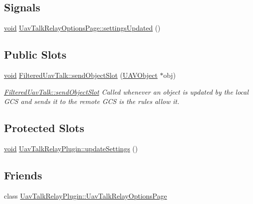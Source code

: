 \subsection*{\-Signals}
\begin{DoxyCompactItemize}
\item 
\hyperlink{group___u_a_v_objects_plugin_ga444cf2ff3f0ecbe028adce838d373f5c}{void} \hyperlink{group___u_a_v_talk_gace88a60fb10cfb6c3994f0a3a8883aa3}{\-Uav\-Talk\-Relay\-Options\-Page\-::settings\-Updated} ()
\end{DoxyCompactItemize}
\subsection*{\-Public \-Slots}
\begin{DoxyCompactItemize}
\item 
\hyperlink{group___u_a_v_objects_plugin_ga444cf2ff3f0ecbe028adce838d373f5c}{void} \hyperlink{group___u_a_v_talk_ga41ca9188bbbc0be7e458f94ef49117df}{\-Filtered\-Uav\-Talk\-::send\-Object\-Slot} (\hyperlink{class_u_a_v_object}{\-U\-A\-V\-Object} $\ast$obj)
\begin{DoxyCompactList}\small\item\em \hyperlink{group___u_a_v_talk_ga41ca9188bbbc0be7e458f94ef49117df}{\-Filtered\-Uav\-Talk\-::send\-Object\-Slot} \-Called whenever an object is updated by the local \-G\-C\-S and sends it to the remote \-G\-C\-S is the rules allow it. \end{DoxyCompactList}\end{DoxyCompactItemize}
\subsection*{\-Protected \-Slots}
\begin{DoxyCompactItemize}
\item 
\hyperlink{group___u_a_v_objects_plugin_ga444cf2ff3f0ecbe028adce838d373f5c}{void} \hyperlink{group___u_a_v_talk_gac6522ac462e3ef789bccecdf33e38779}{\-Uav\-Talk\-Relay\-Plugin\-::update\-Settings} ()
\end{DoxyCompactItemize}
\subsection*{\-Friends}
\begin{DoxyCompactItemize}
\item 
class \hyperlink{group___u_a_v_talk_gaf20a0868107dbd85408f5bcba4e98063}{\-Uav\-Talk\-Relay\-Plugin\-::\-Uav\-Talk\-Relay\-Options\-Page}
\end{DoxyCompactItemize}


